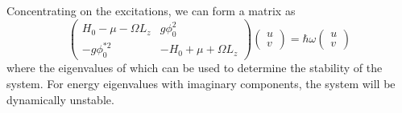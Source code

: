 Concentrating on the excitations, we can form a matrix as
\begin{equation}
    \begin{pmatrix}
        H_0 - \mu -\Omega L_z & g\phi_0^2 \\
        -g\phi_0^{*2} & -H_0 + \mu +\Omega L_z
    \end{pmatrix}
    \begin{pmatrix}
        u \\
        v
    \end{pmatrix}
    = \hbar\omega
    \begin{pmatrix}
        u \\
        v
    \end{pmatrix}
\end{equation}
where the eigenvalues of which can be used to determine the stability of the system. For energy eigenvalues with imaginary components, the system will be dynamically unstable.

